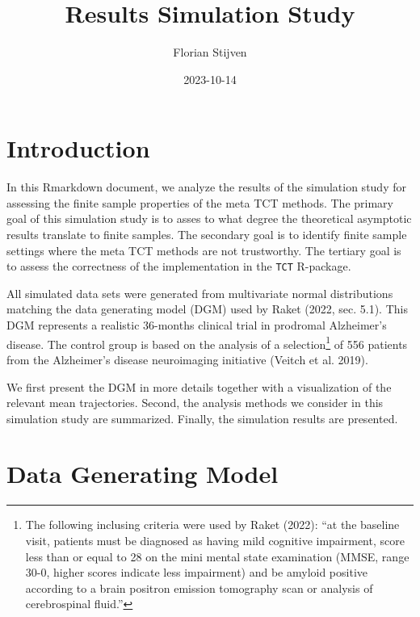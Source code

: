\documentclass[
]{article}
\title{Results Simulation Study}
\author{Florian Stijven}
\date{2023-10-14}
\begin{document}
\maketitle

{
\setcounter{tocdepth}{2}
\tableofcontents
}
\hypertarget{introduction}{%
\section{Introduction}\label{introduction}}

In this Rmarkdown document, we analyze the results of the simulation study for
assessing the finite sample properties of the meta TCT methods. The primary goal
of this simulation study is to asses to what degree the theoretical asymptotic
results translate to finite samples. The secondary goal is to identify finite
sample settings where the meta TCT methods are not trustworthy. The tertiary
goal is to assess the correctness of the implementation in the \texttt{TCT} R-package.

All simulated data sets were generated from multivariate normal distributions
matching the data generating model (DGM) used by Raket (2022, sec. 5.1).
This DGM represents a realistic 36-months clinical trial in
prodromal Alzheimer's disease. The control group is based on the analysis of a
selection\footnote{The following inclusing criteria were used by Raket (2022): ``at
  the baseline visit, patients must be diagnosed as having mild cognitive
  impairment, score less than or equal to 28 on the mini mental state examination
  (MMSE, range 30-0, higher scores indicate less impairment) and be amyloid
  positive according to a brain positron emission tomography scan or analysis of
  cerebrospinal fluid.''} of 556 patients from the Alzheimer's disease neuroimaging initiative
(Veitch et al. 2019).

We first present the DGM in more details together with a visualization of the
relevant mean trajectories. Second, the analysis methods we consider in this
simulation study are summarized. Finally, the simulation results are presented.

\hypertarget{data-generating-model}{%
\section{Data Generating Model}\label{data-generating-model}}
\end{document}
